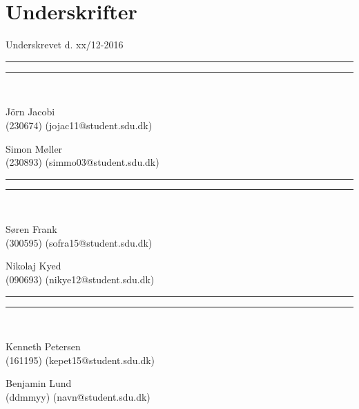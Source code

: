 
\section*{Underskrifter}
\vspace{3ex} \hfill Underskrevet d. xx/12-2016\\

\newlength{\streg} \setlength{\streg}{0.49\linewidth}
\vspace*{\fill} \rule{\streg}{1pt} \hfill \rule{\streg}{1pt}\\
\begin{minipage}[b]{\streg}
 \centering
 \rule{0pt}{4ex}
 J\"{o}rn Jacobi \\
 {\footnotesize (230674) (jojac11@student.sdu.dk)}
\end{minipage}
\hfill
\begin{minipage}[b]{\streg}
 \centering
 Simon Møller \\
 {\footnotesize (230893) (simmo03@student.sdu.dk)}
\end{minipage}

\vspace*{\fill} \rule{\streg}{1pt} \hfill \rule{\streg}{1pt}\\
\begin{minipage}[b]{\streg}
 \centering
 \rule{0pt}{4ex}
 Søren Frank \\
 {\footnotesize (300595) (sofra15@student.sdu.dk)}
\end{minipage}
\hfill
\begin{minipage}[b]{\streg}
 \centering
 Nikolaj Kyed \\
 {\footnotesize (090693) (nikye12@student.sdu.dk)}
\end{minipage}

\vspace*{\fill} \rule{\streg}{1pt} \hfill \rule{\streg}{1pt}\\
\begin{minipage}[b]{\streg}
	\centering
	\rule{0pt}{4ex}
	Kenneth Petersen \\
	{\footnotesize (161195) (kepet15@student.sdu.dk)}
\end{minipage}
\hfill
\begin{minipage}[b]{\streg}
	\centering
	Benjamin Lund \\
	{\footnotesize (ddmmyy) (navn@student.sdu.dk)}
\end{minipage}